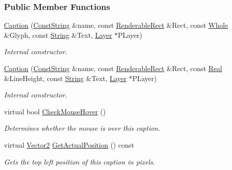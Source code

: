 \subsubsection*{Public Member Functions}
\begin{DoxyCompactItemize}
\item 
\hyperlink{classMezzanine_1_1UI_1_1Caption_ad0dc49d641507e277174b4f2a3562a89}{Caption} (\hyperlink{namespaceMezzanine_a63cd699ac54b73953f35ec9cfc05e506}{ConstString} \&name, const \hyperlink{structMezzanine_1_1UI_1_1RenderableRect}{RenderableRect} \&Rect, const \hyperlink{namespaceMezzanine_adcbb6ce6d1eb4379d109e51171e2e493}{Whole} \&Glyph, const \hyperlink{namespaceMezzanine_acf9fcc130e6ebf08e3d8491aebcf1c86}{String} \&Text, \hyperlink{classMezzanine_1_1UI_1_1Layer}{Layer} $\ast$PLayer)
\begin{DoxyCompactList}\small\item\em Internal constructor. \item\end{DoxyCompactList}\item 
\hyperlink{classMezzanine_1_1UI_1_1Caption_a1604f65f43a488ef3f24f59ce300aa9a}{Caption} (\hyperlink{namespaceMezzanine_a63cd699ac54b73953f35ec9cfc05e506}{ConstString} \&name, const \hyperlink{structMezzanine_1_1UI_1_1RenderableRect}{RenderableRect} \&Rect, const \hyperlink{namespaceMezzanine_a726731b1a7df72bf3583e4a97282c6f6}{Real} \&LineHeight, const \hyperlink{namespaceMezzanine_acf9fcc130e6ebf08e3d8491aebcf1c86}{String} \&Text, \hyperlink{classMezzanine_1_1UI_1_1Layer}{Layer} $\ast$PLayer)
\begin{DoxyCompactList}\small\item\em Internal constructor. \item\end{DoxyCompactList}\item 
virtual bool \hyperlink{classMezzanine_1_1UI_1_1Caption_a57ece85ea6c97b542d62de245ddb82f1}{CheckMouseHover} ()
\begin{DoxyCompactList}\small\item\em Determines whether the mouse is over this caption. \item\end{DoxyCompactList}\item 
virtual \hyperlink{classMezzanine_1_1Vector2}{Vector2} \hyperlink{classMezzanine_1_1UI_1_1Caption_a1936b1cc9ac22eddc81d92f10fef314d}{GetActualPosition} () const 
\begin{DoxyCompactList}\small\item\em Gets the top left position of this caption in pixels. \item\end{DoxyCompactList}\item 

\end{DoxyCompactItemize}
